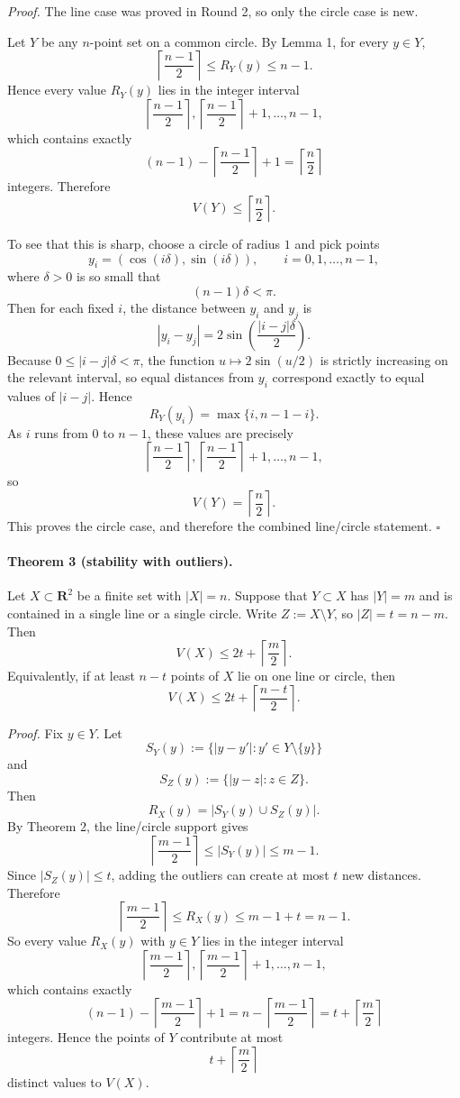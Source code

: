 \medskip
\noindent
\textit{Proof.}
The line case was proved in Round 2, so only the circle case is new.

Let \(Y\) be any \(n\)-point set on a common circle.  By Lemma 1, for every \(y\in Y\),
\[
\left\lceil\frac{n-1}{2}\right\rceil \le R_Y(y)\le n-1.
\]
Hence every value \(R_Y(y)\) lies in the integer interval
\[
\left\lceil\frac{n-1}{2}\right\rceil,\left\lceil\frac{n-1}{2}\right\rceil+1,\dots,n-1,
\]
which contains exactly
\[
(n-1)-\left\lceil\frac{n-1}{2}\right\rceil+1=\left\lceil\frac{n}{2}\right\rceil
\]
integers.  Therefore
\[
V(Y)\le \left\lceil\frac{n}{2}\right\rceil.
\]

To see that this is sharp, choose a circle of radius \(1\) and pick points
\[
y_i=(\cos(i\delta),\sin(i\delta)),\qquad i=0,1,\dots,n-1,
\]
where \(\delta>0\) is so small that
\[
(n-1)\delta<\pi.
\]
Then for each fixed \(i\), the distance between \(y_i\) and \(y_j\) is
\[
|y_i-y_j|=2\sin\!\left(\frac{|i-j|\delta}{2}\right).
\]
Because \(0\le |i-j|\delta<\pi\), the function \(u\mapsto 2\sin(u/2)\) is strictly increasing on the relevant interval, so equal distances from \(y_i\) correspond exactly to equal values of \(|i-j|\).  Hence
\[
R_Y(y_i)=\max\{i,n-1-i\}.
\]
As \(i\) runs from \(0\) to \(n-1\), these values are precisely
\[
\left\lceil\frac{n-1}{2}\right\rceil,\left\lceil\frac{n-1}{2}\right\rceil+1,\dots,n-1,
\]
so
\[
V(Y)=\left\lceil\frac{n}{2}\right\rceil.
\]
This proves the circle case, and therefore the combined line/circle statement. \hfill\(\square\)

\paragraph{Theorem 3 (stability with outliers).}
Let \(X\subset \mathbf{R}^2\) be a finite set with \(|X|=n\).  Suppose that \(Y\subset X\) has \(|Y|=m\) and is contained in a single line or a single circle.  Write \(Z:=X\setminus Y\), so \(|Z|=t=n-m\).  Then
\[
V(X)\le 2t+\left\lceil\frac{m}{2}\right\rceil.
\]
Equivalently, if at least \(n-t\) points of \(X\) lie on one line or circle, then
\[
V(X)\le 2t+\left\lceil\frac{n-t}{2}\right\rceil.
\]

\medskip
\noindent
\textit{Proof.}
Fix \(y\in Y\).  Let
\[
S_Y(y):=\{ |y-y'|:y'\in Y\setminus\{y\}\}
\]
and
\[
S_Z(y):=\{ |y-z|:z\in Z\}.
\]
Then
\[
R_X(y)=|S_Y(y)\cup S_Z(y)|.
\]
By Theorem 2, the line/circle support gives
\[
\left\lceil\frac{m-1}{2}\right\rceil \le |S_Y(y)|\le m-1.
\]
Since \(|S_Z(y)|\le t\), adding the outliers can create at most \(t\) new distances.  Therefore
\[
\left\lceil\frac{m-1}{2}\right\rceil \le R_X(y)\le m-1+t=n-1.
\]
So every value \(R_X(y)\) with \(y\in Y\) lies in the integer interval
\[
\left\lceil\frac{m-1}{2}\right\rceil,\left\lceil\frac{m-1}{2}\right\rceil+1,\dots,n-1,
\]
which contains exactly
\[
(n-1)-\left\lceil\frac{m-1}{2}\right\rceil+1
= n-\left\lceil\frac{m-1}{2}\right\rceil
= t+\left\lceil\frac{m}{2}\right\rceil
\]
integers.  Hence the points of \(Y\) contribute at most
\[
t+\left\lceil\frac{m}{2}\right\rceil
\]
distinct values to \(V(X)\).

